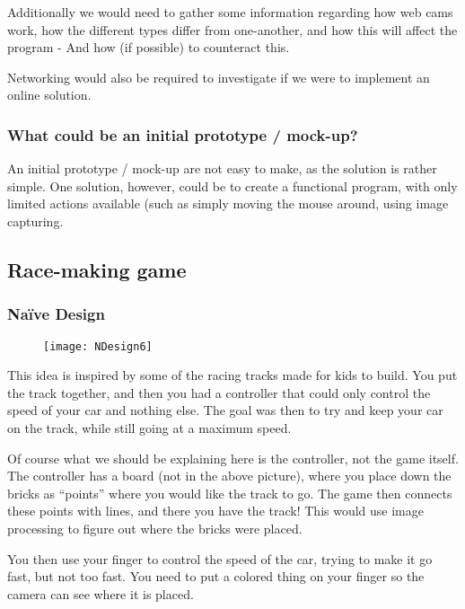 Additionally we would need to gather some information regarding how web cams work, how the different types differ from one-another, and how this will affect the program - And how (if possible) to counteract this.
\bigskip

Networking would also be required to investigate if we were to implement an online solution. 

\subsubsection*{What could be an initial prototype / mock-up?}
An initial prototype / mock-up are not easy to make, as the solution is rather simple. One solution, however, could be to create a functional program, with only limited actions available (such as simply moving the mouse around, using image capturing.

\pagebreak

\subsection{Race-making game} \label{nd6}
\subsubsection*{Naïve Design}
\begin{figure}[h]
\centering
\texttt{[image: NDesign6]}
\caption{}
\label{fig:ndesign6}
\end{figure}

This idea is inspired by some of the racing tracks made for kids to build. You put the track together, and then you had a controller that could only control the speed of your car and nothing else. The goal was then to try and keep your car on the track, while still going at a maximum speed.
\bigskip

Of course what we should be explaining here is the controller, not the game itself. The controller has a board (not in the above picture), where you place down the bricks as “points” where you would like the track to go. The game then connects these points with lines, and there you have the track! This would use image processing to figure out where the bricks were placed.
\bigskip

You then use your finger to control the speed of the car, trying to make it go fast, but not too fast. You need to put a colored thing on your finger so the camera can see where it is placed.
\bigskip 

